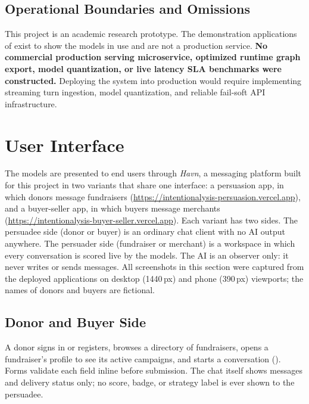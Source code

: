 \subsection{Operational Boundaries and Omissions}
This project is an academic research prototype. The demonstration applications of  exist to show the models in use and are not a production service. \textbf{No commercial production serving microservice, optimized runtime graph export, model quantization, or live latency SLA benchmarks were constructed.} Deploying the system into production would require implementing streaming turn ingestion, model quantization, and reliable fail-soft API infrastructure.

\section{User Interface}
\label{sec:ui}

The models are presented to end users through \emph{Havn}, a messaging platform built for this project in two variants that share one interface: a persuasion app, in which donors message fundraisers (\url{https://intentionalysis-persuasion.vercel.app}), and a buyer-seller app, in which buyers message merchants (\url{https://intentionalysis-buyer-seller.vercel.app}). Each variant has two sides. The persuadee side (donor or buyer) is an ordinary chat client with no AI output anywhere. The persuader side (fundraiser or merchant) is a workspace in which every conversation is scored live by the models. The AI is an observer only: it never writes or sends messages. All screenshots in this section were captured from the deployed applications on desktop (1440\,px) and phone (390\,px) viewports; the names of donors and buyers are fictional.

\subsection{Donor and Buyer Side}
A donor signs in or registers, browses a directory of fundraisers, opens a fundraiser's profile to see its active campaigns, and starts a conversation (). Forms validate each field inline before submission. The chat itself shows messages and delivery status only; no score, badge, or strategy label is ever shown to the persuadee.

